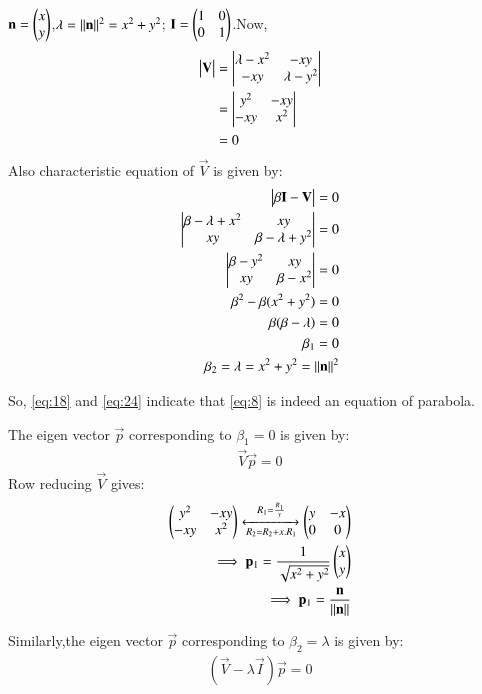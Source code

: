 \documentclass[journal,12pt,twocolumn]{IEEEtran}
\begin{document}
$\mathbf{n}=\begin{pmatrix}x\\y\end{pmatrix}$,$\lambda=\Vert\mathbf{n}\rVert^2=x^2+y^2$; $\mathbf{I}=\begin{pmatrix}1&0\\0&1\end{pmatrix}$.Now,
\begin{align}
\begin{vmatrix}\mathbf{V}\end{vmatrix}&=\begin{vmatrix}\lambda-x^2&-xy\\-xy&\lambda-y^2\end{vmatrix}\\
&=\begin{vmatrix}y^2&-xy\\-xy&x^2\end{vmatrix}\\
&=0\label{eq:18}
\end{align}
Also characteristic equation of $\vec{V}$ is given by:
\begin{align}
\begin{vmatrix}\beta\mathbf{I}-\mathbf{V}\end{vmatrix}=0\\
\begin{vmatrix}\beta-\lambda+x^2&xy\\xy&\beta-\lambda+y^2\end{vmatrix}=0\\
\begin{vmatrix}\beta-y^2&xy\\xy&\beta-x^2\end{vmatrix}=0\\
\beta^2-\beta(x^2+y^2)=0\\
\beta(\beta-\lambda)=0\\
\beta_{1}=0\\\label{eq:24}
\beta_{2}=\lambda=x^2+y^2=\Vert\mathbf{n}\rVert^2
\end{align}

So, \eqref{eq:18} and \eqref{eq:24} indicate that \eqref{eq:8} is indeed an equation of parabola.

The eigen vector $\vec{p}$ corresponding to $\beta_{1}=0$ is given by:
\begin{align}
\vec{V}\vec{p}=0
\end{align}
Row reducing $\vec{V}$ gives:
\begin{align}
\begin{pmatrix}y^2&-xy\\-xy&x^2\end{pmatrix}\xleftrightarrow[R_2=R_2+x.R_1]{R_1=\frac{R_1}{y}}\begin{pmatrix}y&-x\\0&0\end{pmatrix}\\
\implies\mathbf{p}_{1}=\frac{1}{\sqrt{x^2+y^2}}\begin{pmatrix}x\\y\end{pmatrix}\\
\implies\mathbf{p}_{1}=\frac{\mathbf{n}}{\Vert\mathbf{n}\rVert}
\end{align}

Similarly,the eigen vector $\vec{p}$ corresponding to $\beta_{2}=\lambda$ is given by:
\begin{align}
(\vec{V}-\lambda{\vec{I}})\vec{p}=0
\end{align}
\end{document}
